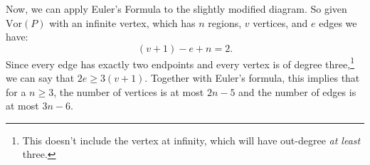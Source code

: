 \documentclass[12pt,twoside]{reedthesis}
\begin{document}

    Now, we can apply Euler's Formula to the slightly modified diagram. So given $\mbox{Vor}(P)$ with an infinite vertex, which has $n$ regions, $v$ vertices, and $e$ edges we have:
    $$(v + 1) - e + n = 2.$$ Since every edge has exactly two endpoints and every vertex is of degree three,\footnote{This doesn't include the vertex at infinity, which will have out-degree \emph{at least} three.} we can say that $2e \geq 3(v + 1)$. Together with Euler's formula, this implies that for a $n\geq 3$, the number of vertices is at most $2n -5$ and the number of edges is at most $3n -6$. 


\end{document}
